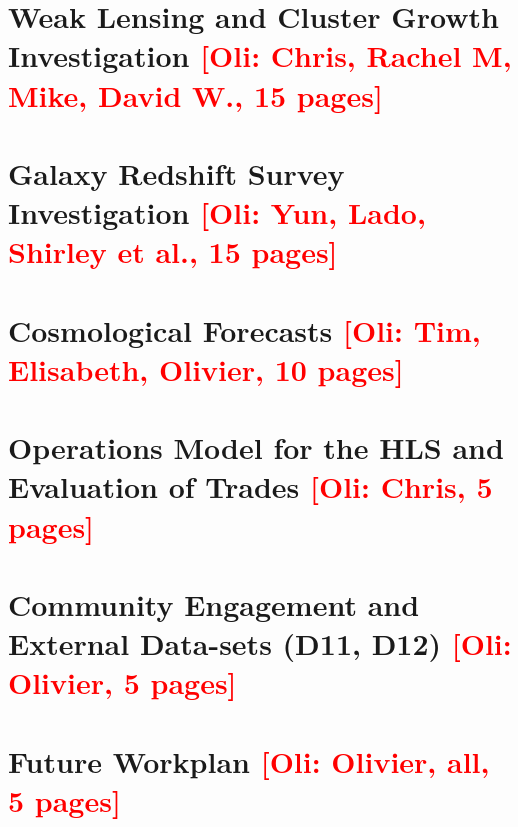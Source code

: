 \documentclass[11pt]{article}
\newcommand{\Oli}[1]{\textcolor{red}{[{\bf Oli}: #1]}}
\begin{document}
\section{Weak Lensing and Cluster Growth Investigation \Oli{Chris,
    Rachel M, Mike, David W., 15 pages}}
\label{sec:wl_gal-clusters}


\section{Galaxy Redshift Survey Investigation \Oli{Yun, Lado, Shirley et al., 15 pages}}
\label{sec:gc}


\section{Cosmological Forecasts \Oli{Tim, Elisabeth, Olivier, 10 pages}}
\label{sec:forecast}


\section{Operations Model for the HLS and Evaluation of Trades \Oli{Chris, 5 pages}}
\label{sec:operation}


\section{Community Engagement and External Data-sets (D11, D12) \Oli{Olivier, 5 pages}}
\label{sec:engagement}


\section{Future Workplan \Oli{Olivier, all, 5 pages}}
\label{sec:workplan}

\end{document}
